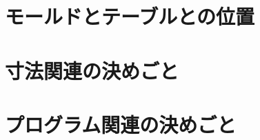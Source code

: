 \begin{appendices}
\Apart





\chapter{モールドとテーブルとの位置}





\chapter{寸法関連の決めごと}





\chapter{プログラム関連の決めごと}






\end{appendices}

